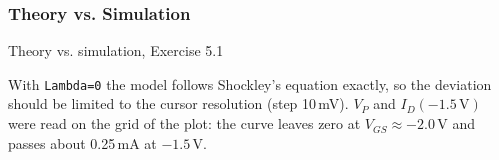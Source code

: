 \subsubsection*{Theory vs. Simulation}
\begin{comparison}{Theory vs. simulation, Exercise 5.1}
\end{comparison}
\begin{solution}
With \texttt{Lambda=0} the model follows Shockley's equation exactly, so the deviation should be limited to the cursor
resolution (step 10\,mV). $V_P$ and $I_D(-1.5\,\mathrm{V})$ were read on the grid of the plot: the curve leaves zero at
$V_{GS} \approx -2.0$\,V and passes about 0.25\,mA at $-1.5$\,V.
\end{solution}
